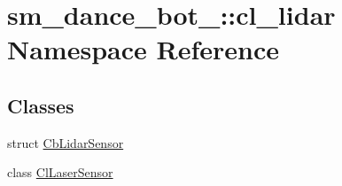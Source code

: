 \hypertarget{namespacesm__dance__bot__3_1_1cl__lidar}{}\section{sm\+\_\+dance\+\_\+bot\+\_\+:\+:cl\+\_\+lidar Namespace Reference}
\label{namespacesm__dance__bot__3_1_1cl__lidar}
\subsection*{Classes}
\begin{DoxyCompactItemize}
\item 
struct \hyperlink{structsm__dance__bot__3_1_1cl__lidar_1_1CbLidarSensor}{Cb\+Lidar\+Sensor}
\item 
class \hyperlink{classsm__dance__bot__3_1_1cl__lidar_1_1ClLaserSensor}{Cl\+Laser\+Sensor}
\end{DoxyCompactItemize}
